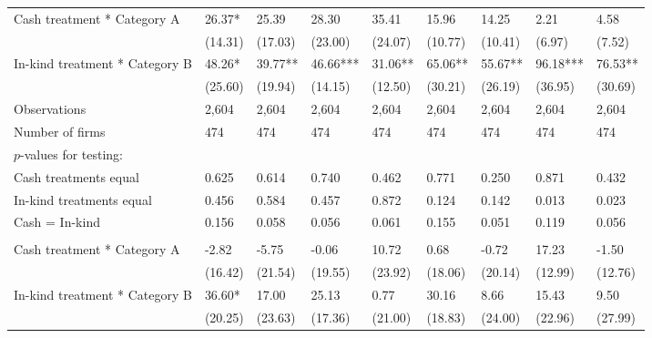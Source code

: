 \begin{table}[H]
{\begin{tabular}{lllllllll}
\hspace{1em}Cash treatment * Category A & 26.37* & 25.39 & 28.30 & 35.41 & 15.96 & 14.25 & 2.21 & 4.58\\
\hspace{1em} & (14.31) & (17.03) & (23.00) & (24.07) & (10.77) & (10.41) & (6.97) & (7.52)\\
\hspace{1em}In-kind treatment * Category B & 48.26* & 39.77** & 46.66*** & 31.06** & 65.06** & 55.67** & 96.18*** & 76.53**\\
\hspace{1em} & (25.60) & (19.94) & (14.15) & (12.50) & (30.21) & (26.19) & (36.95) & (30.69)\\
\hspace{1em}Observations & 2,604 & 2,604 & 2,604 & 2,604 & 2,604 & 2,604 & 2,604 & 2,604\\
\hspace{1em}Number of firms & 474 & 474 & 474 & 474 & 474 & 474 & 474 & 474\\
\hspace{1em}$p$-values for testing: &  &  &  &  &  &  &  \vphantom{1}& \\
\hspace{1em}\hspace{1em} Cash treatments equal & 0.625 & 0.614 & 0.740 & 0.462 & 0.771 & 0.250 & 0.871 & 0.432\\
\hspace{1em}\hspace{1em} In-kind treatments equal & 0.456 & 0.584 & 0.457 & 0.872 & 0.124 & 0.142 & 0.013 & 0.023\\
\hspace{1em}\hspace{1em} Cash = In-kind & 0.156 & 0.058 & 0.056 & 0.061 & 0.155 & 0.051 & 0.119 & 0.056\\
\addlinespace[0.3em]
\multicolumn{9}{l}{\textbf{Panel B: Males}}\\
\hspace{1em}Cash treatment * Category A & -2.82 & -5.75 & -0.06 & 10.72 & 0.68 & -0.72 & 17.23 & -1.50\\
\hspace{1em} & (16.42) & (21.54) & (19.55) & (23.92) & (18.06) & (20.14) & (12.99) & (12.76)\\
\hspace{1em}In-kind treatment * Category B & 36.60* & 17.00 & 25.13 & 0.77 & 30.16 & 8.66 & 15.43 & 9.50\\
\hspace{1em} & (20.25) & (23.63) & (17.36) & (21.00) & (18.83) & (24.00) & (22.96) & (27.99)\\

\end{tabular}}
\end{table}
